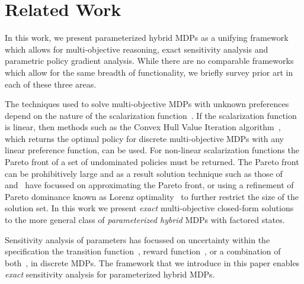 \section{Related Work}
\label{sec:background}


In this work, we present parameterized hybrid MDPs as a unifying framework which allows for multi-objective reasoning, exact sensitivity analysis and parametric policy gradient analysis. While there are no comparable frameworks which allow for the same breadth of functionality, we briefly survey prior art in each of these three areas.

The techniques used to solve multi-objective MDPs with unknown preferences depend on the nature of the scalarization function~\parencite{Roijers_JAIR_2013}. If the scalarization function is linear, then methods such as the Convex Hull Value Iteration algorithm~\parencite{Barrett_ICML_2008}, which returns the optimal policy for discrete multi-objective MDPs with any linear preference function, can be used. For non-linear scalarization functions the Pareto front of a set of undominated policies must be returned. The Pareto front can be prohibitively large and as a result solution technique such as those of~\parencite{Chatterjee_STACS_2006} and~\parencite{Pirotta_AAAI_2015} have focussed on approximating the Pareto front, or using a refinement of Pareto dominance known as Lorenz optimality~\parencite{Perny_AAAI_2013} to further restrict the size of the solution set. In this work we present \textit{exact} multi-objective closed-form solutions to the more general class of \textit{parameterized hybrid} MDPs with factored states. 

Sensitivity analysis of parameters has focussed on uncertainty within the specification the transition function~\parencite{Kalyanasundaram_AJC_2004}, reward function~\parencite{Tan_JAP_2011, Hopp_JOTA_1988}, or a combination of both~\parencite{Givan_AI_2000}, in discrete MDPs. The framework that we introduce in this paper enables \textit{exact} sensitivity analysis for parameterized hybrid MDPs.

